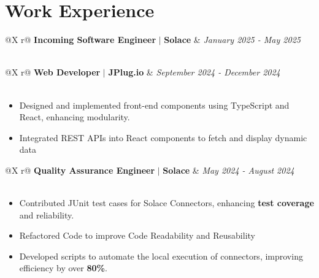 \documentclass[a4paper,12pt]{article}
\begin{document}

\section{Work Experience}

\begin{tabularx}{\linewidth}{ @{}X r@{} }
    {\textbf{Incoming Software Engineer}} $\vert$ {\textbf{Solace}} & \textit{January 2025 - May 2025} \\
     \\
\end{tabularx}


\begin{tabularx}{\linewidth}{ @{}X r@{} }
    {\textbf{Web Developer}} $\vert$ {\textbf{JPlug.io}} & \textit{September 2024 - December 2024} \\
     \\
\end{tabularx}

\begin{itemize} [nosep,leftmargin=*]
    \item Designed and implemented front-end components using TypeScript and React, enhancing modularity.
    \item Integrated REST APIs into React components to fetch and display dynamic data
\end{itemize}

\begin{tabularx}{\linewidth}{ @{}X r@{} }
    {\textbf{Quality Assurance Engineer}} $\vert$ {\textbf{Solace}} & \textit{May 2024 - August 2024} \\
     \\
\end{tabularx}
\begin{itemize} [nosep,leftmargin=*]
    \item Contributed JUnit test cases for Solace Connectors, enhancing \textbf{test coverage} and reliability.
    \item Refactored Code to improve Code Readability and Reusability 
    \item Developed scripts to automate the local execution of connectors, improving efficiency by over \textbf{80\%}.
\end{itemize}
\end{document}
